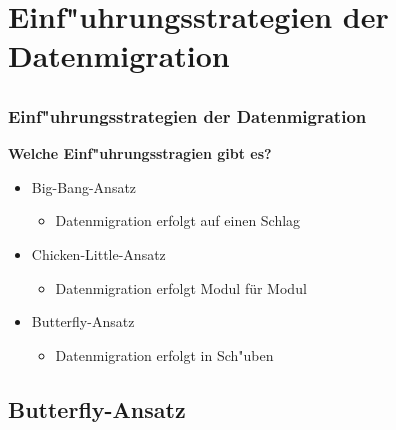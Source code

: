 \documentclass{beamer}
\begin{document}
	\section{Einf"uhrungsstrategien der Datenmigration}
	
	\subsection{}
	
	\begin{frame}
		\frametitle{Einf"uhrungsstrategien der Datenmigration}
		 
		 \textbf{Welche Einf"uhrungsstragien gibt es?}
		 \\
		\begin{itemize}
			\item Big-Bang-Ansatz
			\begin{itemize}
				\item Datenmigration erfolgt auf einen Schlag
			\end{itemize}
			
			\item Chicken-Little-Ansatz
			\begin{itemize}
				\item Datenmigration erfolgt Modul für Modul
			\end{itemize}
			
			\item Butterfly-Ansatz
			\begin{itemize}
				\item Datenmigration erfolgt in Sch"uben
			\end{itemize}
			
		\end{itemize}
		
	\end{frame}
	
	\subsection{Butterfly-Ansatz}
	
\end{document}
